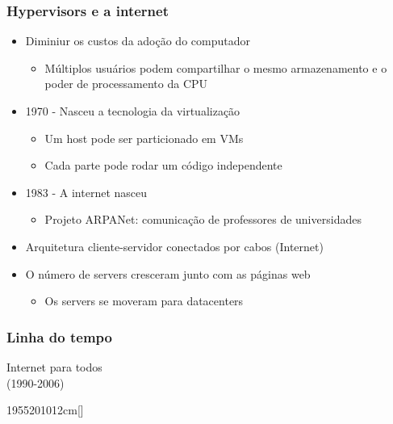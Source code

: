 \begin{frame}[allowframebreaks]
	\frametitle{Hypervisors e a internet}
	\begin{itemize}
		\item Diminiur os custos da adoção do computador
			\begin{itemize}
				\item Múltiplos usuários podem compartilhar o mesmo armazenamento e o poder de processamento da CPU
			\end{itemize}
		\item 1970 - Nasceu a tecnologia da virtualização
			\begin{itemize}
				\item Um host pode ser particionado em VMs
				\item Cada parte pode rodar um código independente
			\end{itemize}
		\framebreak
		\item 1983 - A internet nasceu
			\begin{itemize}
				\item Projeto ARPANet: comunicação de professores de universidades
			\end{itemize}
		\item Arquitetura cliente-servidor conectados por cabos (Internet)
		\item O número de servers cresceram junto com as páginas web
			\begin{itemize}
				\item Os servers se moveram para datacenters
			\end{itemize}
	\end{itemize}
\end{frame}

\begin{frame}
	\frametitle{Linha do tempo}
	\begin{center}
		Internet para todos \\
		(1990-2006)
	\end{center}
	\hfill
	\begin{scriptsize}
	\begin{bf}
	\begin{center}
		\begin{chronology}[10]{1955}{2010}{12cm}[\textwidth]
			\color{lightgreen}
		\end{chronology}
	\end{center}
	\end{bf}
	\end{scriptsize}
\end{frame}

